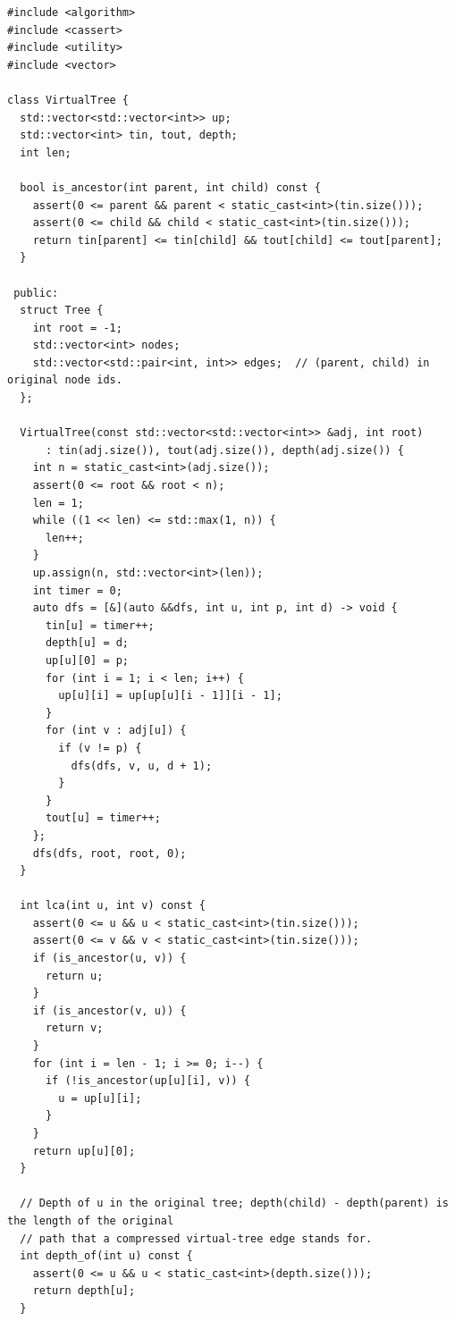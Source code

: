\begin{lstlisting}[style=cpp]
#include <algorithm>
#include <cassert>
#include <utility>
#include <vector>

class VirtualTree {
  std::vector<std::vector<int>> up;
  std::vector<int> tin, tout, depth;
  int len;

  bool is_ancestor(int parent, int child) const {
    assert(0 <= parent && parent < static_cast<int>(tin.size()));
    assert(0 <= child && child < static_cast<int>(tin.size()));
    return tin[parent] <= tin[child] && tout[child] <= tout[parent];
  }

 public:
  struct Tree {
    int root = -1;
    std::vector<int> nodes;
    std::vector<std::pair<int, int>> edges;  // (parent, child) in original node ids.
  };

  VirtualTree(const std::vector<std::vector<int>> &adj, int root)
      : tin(adj.size()), tout(adj.size()), depth(adj.size()) {
    int n = static_cast<int>(adj.size());
    assert(0 <= root && root < n);
    len = 1;
    while ((1 << len) <= std::max(1, n)) {
      len++;
    }
    up.assign(n, std::vector<int>(len));
    int timer = 0;
    auto dfs = [&](auto &&dfs, int u, int p, int d) -> void {
      tin[u] = timer++;
      depth[u] = d;
      up[u][0] = p;
      for (int i = 1; i < len; i++) {
        up[u][i] = up[up[u][i - 1]][i - 1];
      }
      for (int v : adj[u]) {
        if (v != p) {
          dfs(dfs, v, u, d + 1);
        }
      }
      tout[u] = timer++;
    };
    dfs(dfs, root, root, 0);
  }

  int lca(int u, int v) const {
    assert(0 <= u && u < static_cast<int>(tin.size()));
    assert(0 <= v && v < static_cast<int>(tin.size()));
    if (is_ancestor(u, v)) {
      return u;
    }
    if (is_ancestor(v, u)) {
      return v;
    }
    for (int i = len - 1; i >= 0; i--) {
      if (!is_ancestor(up[u][i], v)) {
        u = up[u][i];
      }
    }
    return up[u][0];
  }

  // Depth of u in the original tree; depth(child) - depth(parent) is the length of the original
  // path that a compressed virtual-tree edge stands for.
  int depth_of(int u) const {
    assert(0 <= u && u < static_cast<int>(depth.size()));
    return depth[u];
  }


\end{lstlisting}
